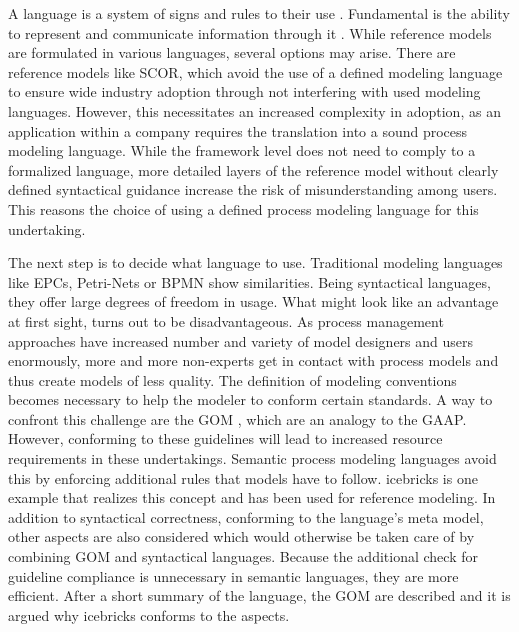 	 A language is a system of signs and rules to their use \citep[]{holten1999}. Fundamental is the ability to represent and communicate information through it \citep[]{brocke2003referenzmodellierung}. While reference models are formulated in various languages, several options may arise. There are reference models like \acrshort{SCOR}, which avoid the use of a defined modeling language to ensure wide industry adoption through not interfering with used modeling languages. However, this necessitates an increased complexity in adoption, as an application within a company requires the translation into a sound process modeling language. While the framework level does not need to comply to a formalized language, more detailed layers of the reference model without clearly defined syntactical guidance increase the risk of misunderstanding among users.
	 This reasons the choice of using a defined process modeling language for this undertaking.
	 
	 The next step is to decide what language to use. Traditional modeling languages like \acrfull{EPC}s, Petri-Nets or \acrfull{BPMN} show similarities. Being syntactical languages, they offer large degrees of freedom in usage. What might look like an advantage at first sight, turns out to be disadvantageous. As process management approaches have increased number and variety of model designers and users enormously, more and more non-experts get in contact with process models and thus create models of less quality. The definition of modeling conventions becomes necessary to help the modeler to conform certain standards. A way to confront this challenge are the \acrfull{GOM} \citep{BeckerGOM2012}, which are an analogy to the \acrfull{GAAP}. However, conforming to these guidelines will lead to increased resource requirements in these undertakings. Semantic process modeling languages avoid this by enforcing additional rules that models have to follow. icebricks \citep{becker2015icebricks} is one example that realizes this concept and has been used for reference modeling. In addition to syntactical correctness, \ie conforming to the language's meta model, other aspects are also considered which would otherwise be taken care of by combining \acrshort{GOM} and syntactical languages. Because the additional check for guideline compliance is unnecessary in semantic languages, they are more efficient. After a short summary of the language,  the \acrshort{GOM} are described and it is argued why icebricks conforms to the aspects. 
	 
